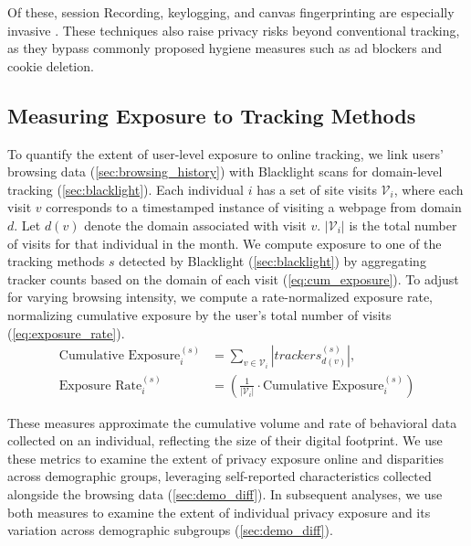 \documentclass[12pt, letterpaper]{article}
\begin{document}
Of these, session Recording, keylogging, and canvas fingerprinting are especially invasive \citep{Acar2014, karaj2018whotracks, blacklight, MS12, leakyforms}. These techniques also raise privacy risks beyond conventional tracking, as they bypass commonly proposed hygiene measures such as ad blockers and cookie deletion.

\subsection{Measuring Exposure to Tracking Methods}
\label{sec:measuring_exposure}

To quantify the extent of user-level exposure to online tracking, we link users' browsing data (\cref{sec:browsing_history}) with Blacklight scans for domain-level tracking (\cref{sec:blacklight}). Each individual $i$ has a set of site visits $\mathcal{V}_i$, where each visit $v$ corresponds to a timestamped instance of visiting a webpage from domain $d$. Let $d(v)$ denote the domain associated with visit $v$. $\vert \mathcal{V}_i \vert$ is the total number of visits for that individual in the month. We compute exposure to one of the tracking methods $s$ detected by Blacklight (\cref{sec:blacklight}) by aggregating tracker counts based on the domain of each visit (\cref{eq:cum_exposure}). To adjust for varying browsing intensity, we compute a rate-normalized exposure rate, normalizing cumulative exposure by the user's total number of visits (\cref{eq:exposure_rate}). %
\begin{align}
\text{Cumulative Exposure}_i^{(s)} &= 
    \sum_{v \in \mathcal{V}_i}
    \left\vert 
        trackers^{(s)}_{d(v)} 
    \right\vert,
\label{eq:cum_exposure} \\
\text{Exposure Rate}_i^{(s)} &= 
    \left(
        \frac{1}{\vert \mathcal{V}_i \vert}
        \cdot
        \text{Cumulative Exposure}_i^{(s)}
    \right) 
\label{eq:exposure_rate}
\end{align}

These measures approximate the cumulative volume and rate of behavioral data collected on an individual, reflecting the size of their digital footprint.
We use these metrics to examine the extent of privacy exposure online and disparities across demographic groups, leveraging self-reported characteristics collected alongside the browsing data (\cref{sec:demo_diff}).
In subsequent analyses, we use both measures to examine the extent of individual privacy exposure and its variation across demographic subgroups (\cref{sec:demo_diff}).
\end{document}
